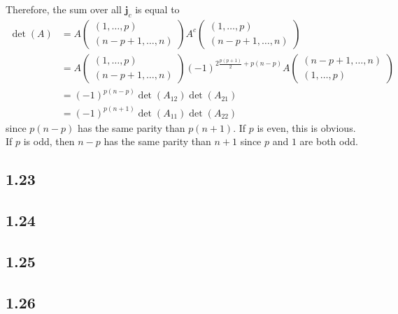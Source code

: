 \begin{solution}
\begin{itemize}
      Therefore, the sum over all $\mathbf{j}_c$
      is equal to
      \begin{align*}
        \det(A) & =
        A
        \begin{pmatrix}
          (1, \ldots, p)\\
          (n-p+1, \ldots, n)
        \end{pmatrix}
        A^c
        \begin{pmatrix}
          (1, \ldots, p)\\
          (n-p+1, \ldots, n)
        \end{pmatrix}\\
        & = A
        \begin{pmatrix}
          (1, \ldots, p)\\
          (n-p+1, \ldots, n)
        \end{pmatrix}
        (-1)^{2\frac{p(p+1)}{2} + p(n-p)}
        A
        \begin{pmatrix}
          (n-p+1, \ldots, n)\\
          (1, \ldots, p)
        \end{pmatrix}\\
        & = (-1)^{p(n-p)}\det(A_{12}) \det(A_{21})\\
        & = (-1)^{p(n+1)}\det(A_{11}) \det(A_{22})
      \end{align*}
      since $p(n-p)$ has the same parity than $p(n+1)$.
      If $p$ is even, this is obvious.
      If $p$ is odd, then $n-p$ has the same parity than $n+1$ since $p$ and $1$ are both odd.
  \end{itemize}
\end{solution}

\subsection*{1.23}
\nosolution

\subsection*{1.24}
\nosolution

\subsection*{1.25}
\nosolution

\subsection*{1.26}
\nosolution

